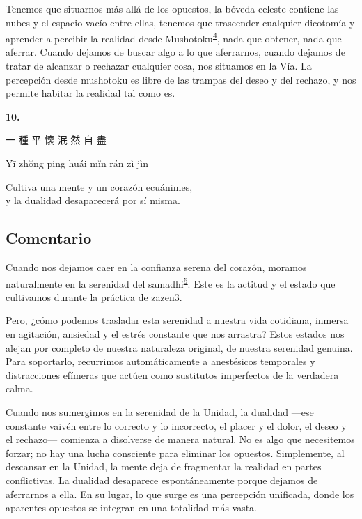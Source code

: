 \documentclass[
  a5paperpaper,
]{article}
\begin{document}
Tenemos que situarnos más allá de los opuestos, la bóveda celeste
contiene las nubes y el espacio vacío entre ellas, tenemos que
trascender cualquier dicotomía y aprender a percibir la realidad desde
Mushotoku\textsuperscript{\protect\hypertarget{ref4}{\protect\hyperlink{nota4}{4}}},
nada que obtener, nada que aferrar. Cuando dejamos de buscar algo a lo
que aferrarnos, cuando dejamos de tratar de alcanzar o rechazar
cualquier cosa, nos situamos en la Vía. La percepción desde mushotoku es
libre de las trampas del deseo y del rechazo, y nos permite habitar la
realidad tal como es.

\hfill\break

\hypertarget{05}{}
\begin{verseblock}

\newpage

\begin{center}\textbf{10.}\end{center}

一 種 平 懷 泯 然 自 盡

Yī zhŏng ping huái mĭn rán zì jìn

Cultiva una mente y un corazón ecuánimes,\\
y la dualidad desaparecerá por sí misma.

\end{verseblock}

\hfill\break

\hypertarget{comentario-9}{%
\subsection{Comentario}\label{comentario-9}}

Cuando nos dejamos caer en la confianza serena del corazón, moramos
naturalmente en la serenidad del
samadhi\textsuperscript{\protect\hypertarget{ref5}{\protect\hyperlink{nota5}{5}}}.
Este es la actitud y el estado que cultivamos durante la práctica de
zazen3.

Pero, ¿cómo podemos trasladar esta serenidad a nuestra vida cotidiana,
inmersa en agitación, ansiedad y el estrés constante que nos arrastra?
Estos estados nos alejan por completo de nuestra naturaleza original, de
nuestra serenidad genuina. Para soportarlo, recurrimos automáticamente a
anestésicos temporales y distracciones efímeras que actúen como
sustitutos imperfectos de la verdadera calma.

Cuando nos sumergimos en la serenidad de la Unidad, la dualidad ---ese
constante vaivén entre lo correcto y lo incorrecto, el placer y el
dolor, el deseo y el rechazo--- comienza a disolverse de manera natural.
No es algo que necesitemos forzar; no hay una lucha consciente para
eliminar los opuestos. Simplemente, al descansar en la Unidad, la mente
deja de fragmentar la realidad en partes conflictivas. La dualidad
desaparece espontáneamente porque dejamos de aferrarnos a ella. En su
lugar, lo que surge es una percepción unificada, donde los aparentes
opuestos se integran en una totalidad más vasta.
\end{document}
